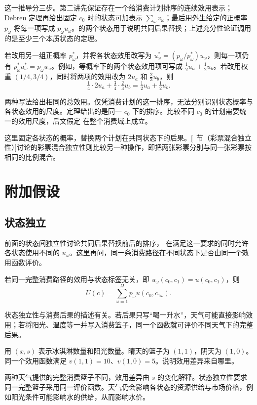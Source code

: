 这一推导分三步。第二讲先保证存在一个给消费计划排序的连续效用表示；Debreu 定理再给出固定 $c_0$ 时的状态可加表示 $\sum_\omega v_\omega$；最后用外生给定的正概率 $p_\omega$ 将每一项写成 $p_\omega u_\omega$。的两个状态用于说明共同后果替换；上述充分性论证调用的是至少三个本质状态的定理。

若改用另一组正概率 $p_\omega^*$，并将各状态效用改写为 $u_\omega^*=(p_\omega/p_\omega^*)u_\omega$，则每一项仍有 $p_\omega^*u_\omega^*=p_\omega u_\omega$。例如，等概率下的两个状态效用项可写成 $\tfrac12u_a+\tfrac12u_b$。若改用权重 $(1/4,3/4)$，同时将两项的效用改为 $2u_a$ 和 $\tfrac23u_b$，则
\[
 \tfrac14\cdot 2u_a+\tfrac34\cdot\tfrac23u_b=\tfrac12u_a+\tfrac12u_b.
\]

两种写法给出相同的总效用。仅凭消费计划的这一排序，无法分别识别状态概率与各状态效用的尺度。定理给出的是同一 $c_0$ 下的排序。比较不同 $c_0$ 的计划需要统一的效用尺度，后文假定 在整个消费域上成立。

这里固定各状态的概率，替换两个计划在共同状态下的后果。[~节（彩票混合独立性）]讨论的彩票混合独立性则比较另一种操作，即把两张彩票分别与同一张彩票按相同的比例混合。


\section{附加假设}\label{sec:wj-six-assumptions}
\subsection{状态独立}
前面的状态间独立性讨论共同后果替换前后的排序， 在满足这一要求的同时允许各状态使用不同的 $u_\omega$。这里再问，同一条消费路径在不同状态下是否由同一个效用函数评价。

\begin{tcolorbox}[knowledge,title=状态独立的期望效用]
若同一完整消费路径的效用与状态标签无关，即 $u_\omega(c_0,c_1)=u(c_0,c_1)$，则
\begin{equation}
 U(c)=\sum_{\omega=1}^{\Omega}p_\omega u(c_0,c_{1\omega}).
 \label{eq:wj-six-2}
\end{equation}
\end{tcolorbox}

状态独立性与消费后果的描述有关。若后果只写“喝一升水”，天气可能直接影响效用；若将阳光、温度等一并写入消费篮子，同一个函数就可评价不同天气下的完整后果。

\begin{tcolorbox}[example,title=课堂例题：把阳光纳入消费篮子]
\begin{question}
用 $(x,s)$ 表示冰淇淋数量和阳光数量。晴天的篮子为 $(1,1)$，阴天为 $(1,0)$。同一个效用函数满足 $v(1,1)=10$、$v(1,0)=5$。说明效用差异来自哪里。
\end{question}
\begin{solution}[blank-type=manual,blank-vsep=3\baselineskip]
两种天气提供的完整消费篮子不同，效用差异由 $s$ 的变化解释。状态独立性要求同一完整篮子采用同一评价函数。天气仍会影响各状态的资源供给与市场价格，例如阳光条件可能影响水的供给，从而影响水价。
\end{solution}
\end{tcolorbox}

